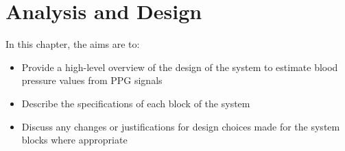 \section{Analysis and Design}

In this chapter, the aims are to:

\begin{itemize}
    \item Provide a high-level overview of the design of the system to estimate blood pressure values from PPG signals
    \item Describe the specifications of each block of the system
    \item Discuss any changes or justifications for design choices made for the system blocks where appropriate
\end{itemize}

